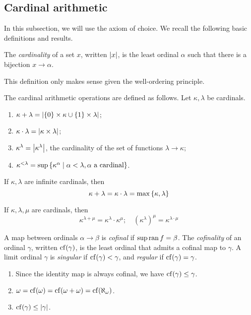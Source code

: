 \subsection{Cardinal arithmetic}
In this subsection, we will use the axiom of choice.
We recall the following basic definitions and results.
\begin{definition}
    The \emph{cardinality} of a set \( x \), written \( \abs{x} \), is the least ordinal \( \alpha \) such that there is a bijection \( x \to \alpha \).
\end{definition}
This definition only makes sense given the well-ordering principle.
\begin{definition}
    The cardinal arithmetic operations are defined as follows.
    Let \( \kappa, \lambda \) be cardinals.
    \begin{enumerate}
        \item \( \kappa + \lambda = \abs{\qty{0} \times \kappa \cup \qty{1} \times \lambda} \);
        \item \( \kappa \cdot \lambda = \abs{\kappa \times \lambda} \);
        \item \( \kappa^\lambda = \abs{\kappa^\lambda} \), the cardinality of the set of functions \( \lambda \to \kappa \);
        \item \( \kappa^{<\lambda} = \sup\qty{\kappa^\alpha \mid \alpha < \lambda, \alpha \text{ a cardinal}} \).
    \end{enumerate}
\end{definition}
\begin{theorem}[Hessenberg]
    If \( \kappa, \lambda \) are infinite cardinals, then
    \[ \kappa + \lambda = \kappa \cdot \lambda = \max\qty{\kappa, \lambda} \]
\end{theorem}
\begin{lemma}
    If \( \kappa, \lambda, \mu \) are cardinals, then
    \[ \kappa^{\lambda + \mu} = \kappa^\lambda \cdot \kappa^\mu;\quad (\kappa^\lambda)^\mu = \kappa^{\lambda \cdot \mu} \]
\end{lemma}
\begin{definition}
    A map between ordinals \( \alpha \to \beta \) is \emph{cofinal} if \( \sup \operatorname{ran} f = \beta \).
    The \emph{cofinality} of an ordinal \( \gamma \), written \( \operatorname{cf}(\gamma) \), is the least ordinal that admits a cofinal map to \( \gamma \).
    A limit ordinal \( \gamma \) is \emph{singular} if \( \operatorname{cf}(\gamma) < \gamma \), and \emph{regular} if \( \operatorname{cf}(\gamma) = \gamma \).
\end{definition}
\begin{remark}
    \begin{enumerate}
        \item Since the identity map is always cofinal, we have \( \operatorname{cf}(\gamma) \leq \gamma \).
        \item \( \omega = \operatorname{cf}(\omega) = \operatorname{cf}(\omega + \omega) = \operatorname{cf}(\aleph_\omega) \).
        \item \( \operatorname{cf}(\gamma) \leq \abs{\gamma} \).
    \end{enumerate}
\end{remark}
